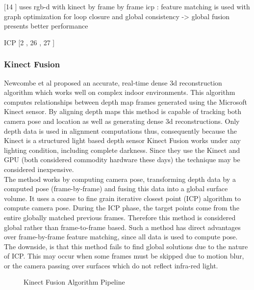 [14 \cite{Henry10Rgb}] uses rgb-d with kinect by frame by frame icp : feature matching is used with graph optimization for loop closure and global consistency -> global fusion presents better performance



ICP [2 \cite{Besl92Method}, 26 \cite{Rusinkiewicz01Efficient}, 27 \cite{Segal09Generalized}]

\subsubsection{Kinect Fusion}

Newcombe et al \cite{Newcombe11Kinectfusion} proposed an accurate, real-time dense 3d reconstruction algorithm which works well on complex indoor environments. This algorithm computes relationships between depth map frames generated using the Microsoft Kinect \cite{Zhang12Microsoft} sensor. By aligning depth maps this method is capable of tracking both camera pose and location as well as generating dense 3d reconstructions. Only depth data is used in alignment computations thus, consequently because the Kinect is a structured light based depth sensor Kinect Fusion works under any lighting condition, including complete darkness. Since they use the Kinect and GPU (both considered commodity hardware these days) the technique may be considered inexpensive. \\

The method works by computing camera pose, transforming depth data by a computed pose (frame-by-frame) and fusing this data into a global surface volume. It uses a coarse to fine grain iterative closest point (ICP) algorithm to compute camera pose. During the ICP phase, the target points come from the entire globally matched previous frames. Therefore this method is considered global rather than frame-to-frame based. Such a method has direct advantages over frame-by-frame feature matching, since all data is used to compute pose. The downside, is that this method fails to find global solutions due to the nature of ICP. This may occur when some frames must be skipped due to motion blur, or the camera passing over surfaces which do not reflect infra-red light. \\

\begin{figure}[!h]
\centering
\caption{Kinect Fusion Algorithm Pipeline \cite{Newcombe11Kinectfusion}}
\label{KFusionPipeliciteHne}
\end{figure}

